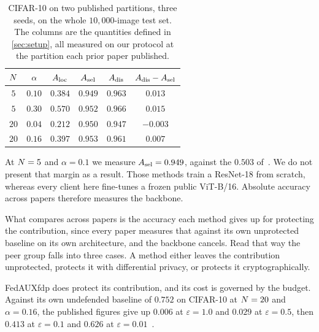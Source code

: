 \begin{table}[t]
\centering
\caption{CIFAR-10 on two published partitions, three seeds, on the whole
$10{,}000$-image test set. The columns are the
quantities defined in \cref{sec:setup}, all measured on our protocol at the
partition each prior paper published.}
\label{tab:peers}
\footnotesize
\setlength{\tabcolsep}{5pt}
\begin{tabular}{cccccc}
\toprule
$N$ & $\alpha$ & $A_{\mathrm{loc}}$ & $A_{\mathrm{sel}}$ & $A_{\mathrm{dis}}$ & $A_{\mathrm{dis}}-A_{\mathrm{sel}}$ \\
\midrule
$5$  & $0.10$ & $0.384$ & $0.949$ & $0.963$ & $0.013$ \\
$5$  & $0.30$ & $0.570$ & $0.952$ & $0.966$ & $0.015$ \\
$20$ & $0.04$ & $0.212$ & $0.950$ & $0.947$ & $-0.003$ \\
$20$ & $0.16$ & $0.397$ & $0.953$ & $0.961$ & $0.007$ \\
\bottomrule
\end{tabular}
\end{table}

At $N=5$ and $\alpha=0.1$ we measure $A_{\mathrm{sel}}=0.949$, against the $0.503$
of~\cite{zhang2022dense}. We do not present that margin as a result. Those methods train a ResNet-18 from scratch, whereas
every client here fine-tunes a frozen public ViT-B/16. Absolute accuracy across papers therefore measures
the backbone.

What compares across papers is the
accuracy each method gives up for protecting the contribution, since every paper measures
that against its own unprotected baseline on its own architecture, and the backbone
cancels. Read that way the peer group falls into three cases. A method either
leaves the contribution unprotected, protects it with differential privacy, or
protects it cryptographically.


FedAUXfdp does protect its contribution, and its cost is governed by the budget.
Against its own undefended baseline of $0.752$ on CIFAR-10 at $N=20$ and
$\alpha=0.16$, the published figures give up $0.006$ at $\varepsilon=1.0$ and
$0.029$ at $\varepsilon=0.5$, then $0.413$ at
$\varepsilon=0.1$ and $0.626$ at $\varepsilon=0.01$~\cite{hoech2022fedauxfdp}.

